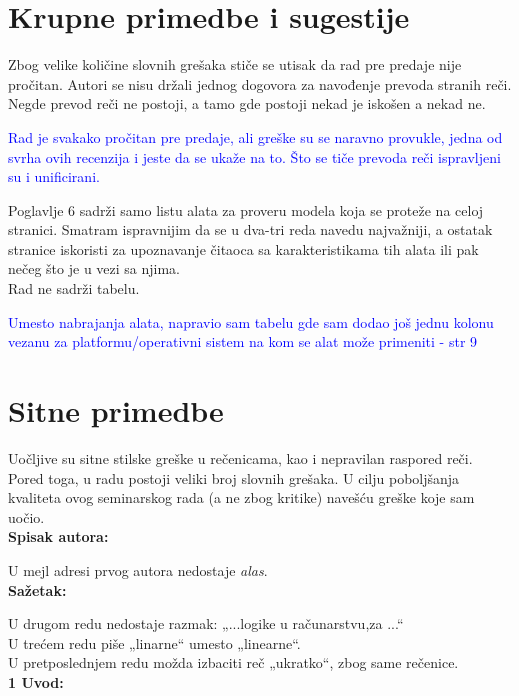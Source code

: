 \documentclass[a4paper]{report}
\newcommand{\odgovor}[1]{\textcolor{blue}{#1}}
\begin{document}
\section{Krupne primedbe i sugestije}
Zbog velike količine slovnih grešaka stiče se utisak da rad pre predaje nije pročitan. Autori se nisu držali jednog dogovora za navođenje prevoda stranih reči. Negde prevod reči ne postoji, a tamo gde postoji nekad je iskošen a nekad ne.

\odgovor{Rad je svakako pročitan pre predaje, ali greške su se naravno provukle, jedna od svrha ovih recenzija i jeste da se ukaže na to. Što se tiče prevoda reči ispravljeni su i unificirani.}

Poglavlje 6 sadrži samo listu alata za proveru modela koja se proteže na celoj stranici. Smatram ispravnijim da se u dva-tri reda navedu najvažniji, a ostatak stranice iskoristi za upoznavanje čitaoca sa karakteristikama tih alata ili pak nečeg što je u vezi sa njima.
\\Rad ne sadrži tabelu.

\odgovor{Umesto nabrajanja alata, napravio sam tabelu gde sam dodao još jednu kolonu vezanu za platformu/operativni sistem na kom se alat može primeniti - str 9}

\section{Sitne primedbe}
Uočljive su sitne stilske greške u rečenicama, kao i nepravilan raspored reči. Pored toga, u radu postoji veliki broj slovnih grešaka. U cilju poboljšanja kvaliteta ovog seminarskog rada (a ne zbog kritike) navešću greške koje sam uočio.
\vspace{0.5cm}\\
\textbf{Spisak autora:} 

U mejl adresi prvog autora nedostaje \emph{alas}.
\vspace{0.5cm}\\
\textbf{Sažetak:}
 
U drugom redu nedostaje razmak: „...logike u računarstvu,za ...“\\
U trećem redu piše „linarne“ umesto „linearne“.\\
U pretposlednjem redu možda izbaciti reč „ukratko“, zbog same rečenice.
\vspace{1cm}
\\ \textbf{1 Uvod:}
\end{document}
